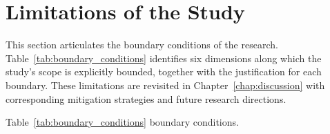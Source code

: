 \section{Limitations of the Study}
\label{sec:scope_limitations}

This section articulates the boundary conditions of the research. Table~\ref{tab:boundary_conditions} identifies six dimensions along which the study's scope is explicitly bounded, together with the justification for each boundary. These limitations are revisited in Chapter~\ref{chap:discussion} with corresponding mitigation strategies and future research directions.


\iffalse %
\noindent Table~\ref{tab:boundary_conditions} boundary conditions.

